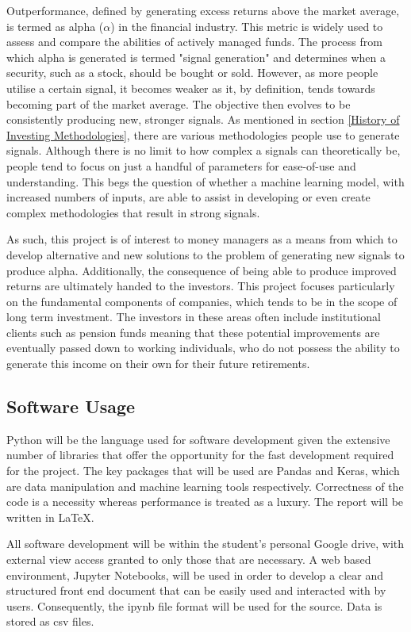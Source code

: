 \documentclass[10pt,onecolumn,letterpaper]{article}
\begin{document}
Outperformance, defined by generating excess returns above the market average, is termed as alpha ($\alpha$) in the financial industry. This metric is widely used to assess and compare the abilities of actively managed funds. The process from which alpha is generated is termed "signal generation" and determines when a security, such as a stock, should be bought or sold. However, as more people utilise a certain signal, it becomes weaker as it, by definition, tends towards becoming part of the market average. The objective then evolves to be consistently producing new, stronger signals. As mentioned in section \ref{History of Investing Methodologies}, there are various methodologies people use to generate signals. Although there is no limit to how complex a signals can theoretically be, people tend to focus on just a handful of parameters for ease-of-use and understanding. This begs the question of whether a machine learning model, with increased numbers of inputs, are able to assist in developing or even create complex methodologies that result in strong signals.  

As such, this project is of interest to money managers as a means from which to develop alternative and new solutions to the problem of generating new signals to produce alpha. Additionally, the consequence of being able to produce improved returns are ultimately handed to the investors. This project focuses particularly on the fundamental components of companies, which tends to be in the scope of long term investment. The investors in these areas often include institutional clients such as pension funds meaning that these potential improvements are eventually passed down to working individuals, who do not possess the ability to generate this income on their own for their future retirements.  

\subsection{Software Usage} 

Python will be the language used for software development given the extensive number of libraries that offer the opportunity for the fast development required for the project. The key packages that will be used are Pandas and Keras, which are data manipulation and machine learning tools respectively. Correctness of the code is a necessity whereas performance is treated as a luxury. The report will be written in LaTeX. 

All software development will be within the student's personal Google drive, with external view access granted to only those that are necessary. A web based environment, Jupyter Notebooks\cite{jupyter_notebook}, will be used in order to develop a clear and structured front end document that can be easily used and interacted with by users. Consequently, the ipynb file format will be used for the source. Data is stored as csv files. 
\end{document}
